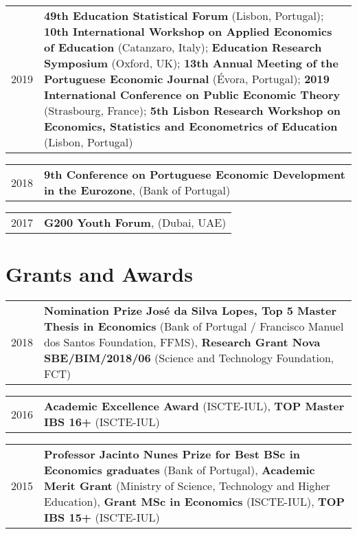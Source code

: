 \documentclass[a4paper,11pt]{article} %
\begin{document}
\begin{tabular}{r|p{13cm}}
	2019 & \textbf{49th Education Statistical Forum} (Lisbon, Portugal); \textbf{10th International Workshop on Applied Economics of Education} (Catanzaro, Italy); \textbf{Education Research Symposium} (Oxford, UK); \textbf{13th Annual Meeting of the Portuguese Economic Journal} (Évora, Portugal); \textbf{2019 International Conference on Public Economic Theory} (Strasbourg, France); \textbf{5th Lisbon Research Workshop on Economics, Statistics and Econometrics of Education} (Lisbon, Portugal)  \\
\end{tabular}


\begin{tabular}{r|p{13cm}}
	2018 & \textbf{9th Conference on Portuguese Economic Development in the Eurozone}, (Bank of Portugal)
\end{tabular}

\begin{tabular}{r|p{13cm}}
	2017 & \textbf{G200 Youth Forum}, (Dubai, UAE) \\
	
\end{tabular}

\section[Grants and Awards]{\faEuro \hspace{3pt} Grants and Awards}

\begin{tabular}{r|p{13cm}}
	2018 & \textbf{Nomination Prize José da Silva Lopes, Top 5 Master Thesis in Economics} (Bank of Portugal / Francisco Manuel dos Santos Foundation, FFMS), \textbf{Research Grant Nova SBE/BIM/2018/06} (Science and Technology Foundation, FCT) \\
\end{tabular}

\begin{tabular}{r|p{13cm}}
	2016 & \textbf{Academic Excellence Award} (ISCTE-IUL), \textbf{TOP Master IBS 16+} (ISCTE-IUL) \\
\end{tabular}

\begin{tabular}{r|p{13cm}}	
	2015 & \textbf{Professor Jacinto Nunes Prize for Best BSc in Economics graduates} (Bank of Portugal), \textbf{Academic Merit Grant} (Ministry of Science, Technology and Higher Education), \textbf{Grant MSc in Economics} (ISCTE-IUL), \textbf{TOP IBS 15+} (ISCTE-IUL) \\
\end{tabular}
\end{document}
